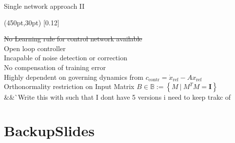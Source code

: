 \documentclass[17pt, t, lualatex]{beamer}
\begin{document}
\begin{frame}{Single network approach II}
	\begin{textblock*}{50pt}(450pt,30pt)
		\scalebox{0.12}[0.12]{
		}
	\end{textblock*}
	\st{No Learning rule for control network available}\\
	Open loop controller\\
	Incapable of noise detection or correction\\
	No compensation of training error\\
	Highly dependent on governing dynamics from $c_{\text{contr}} = \dot{x}_{\text{ref}}-Ax_{\text{ref}}$\\
	Orthonormality restriction on Input Matrix $B \in \mathbb{B} := $$\left\{M\ |\ M^TM = \mathbf{I}\right\}$
	&&^^ Write this with \only such that I dont have 5 versions i need to keep trakc of 
\end{frame}









\section{BackupSlides}\insertsectionpage
\end{document}
